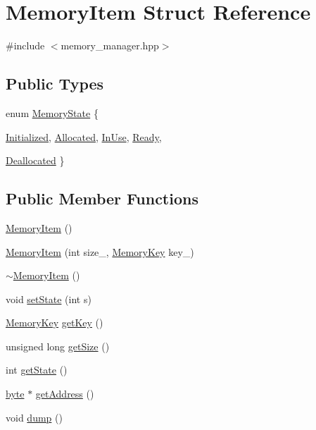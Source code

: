\hypertarget{struct_memory_item}{
\section{MemoryItem Struct Reference}
\label{struct_memory_item}
}


{\ttfamily \#include $<$memory\_\-manager.hpp$>$}\subsection*{Public Types}
\begin{DoxyCompactItemize}
\item 
enum \hyperlink{struct_memory_item_aa2a9caa490ce6080a6f6df62b84084a7}{MemoryState} \{ \par
\hyperlink{struct_memory_item_aa2a9caa490ce6080a6f6df62b84084a7a1e3968fce9ae4201296685e582166f06}{Initialized}, 
\hyperlink{struct_memory_item_aa2a9caa490ce6080a6f6df62b84084a7ab6f0e5cce6443bdc659c192d5babf350}{Allocated}, 
\hyperlink{struct_memory_item_aa2a9caa490ce6080a6f6df62b84084a7a285d348f83b809b488ca76e24081d2aa}{InUse}, 
\hyperlink{struct_memory_item_aa2a9caa490ce6080a6f6df62b84084a7a3702d4e3c6ee6b25e4ab536bb6754880}{Ready}, 
\par
\hyperlink{struct_memory_item_aa2a9caa490ce6080a6f6df62b84084a7aa3decc1bb9c585cb27a13d5590a93d91}{Deallocated}
 \}
\end{DoxyCompactItemize}
\subsection*{Public Member Functions}
\begin{DoxyCompactItemize}
\item 
\hyperlink{struct_memory_item_afa0c66e4afaa19a315a47cb61482d18c}{MemoryItem} ()
\item 
\hyperlink{struct_memory_item_a86015b342bb2d888d7458e1c7c8da71e}{MemoryItem} (int size\_\-, \hyperlink{memory__manager_8hpp_acfb86460d7fe0c6006e77faaae57ee19}{MemoryKey} key\_\-)
\item 
\hyperlink{struct_memory_item_a51966f62038798bfa49be9ae14e99691}{$\sim$MemoryItem} ()
\item 
void \hyperlink{struct_memory_item_ae23ea09a2d3d4d6e311b10b6ce60fd20}{setState} (int s)
\item 
\hyperlink{memory__manager_8hpp_acfb86460d7fe0c6006e77faaae57ee19}{MemoryKey} \hyperlink{struct_memory_item_a21be92140969e7ea8b6859837e9cbab3}{getKey} ()
\item 
unsigned long \hyperlink{struct_memory_item_a1e478ad1487849ca6da2f5c6250a1580}{getSize} ()
\item 
int \hyperlink{struct_memory_item_ae1fd92ca511fee0daeeac11b301977a6}{getState} ()
\item 
\hyperlink{engine_8hpp_a0c8186d9b9b7880309c27230bbb5e69d}{byte} $\ast$ \hyperlink{struct_memory_item_a8e5271126c1eb7d5d5b0d611149b67cf}{getAddress} ()
\item 
void \hyperlink{struct_memory_item_aa6bd06b9d84d23905f34c40759e0dcba}{dump} ()
\end{DoxyCompactItemize}


